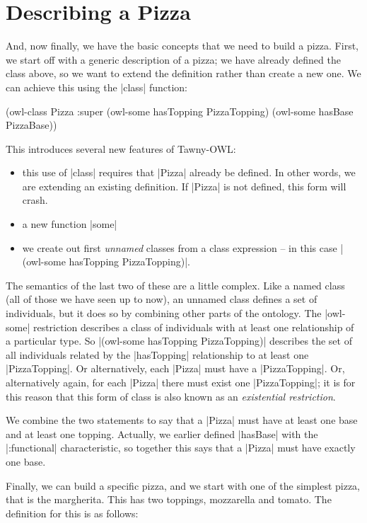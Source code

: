 \section{Describing a Pizza}
\label{sec:describing-pizza}

And, now finally, we have the basic concepts that we need to build a pizza.
First, we start off with a generic description of a pizza; we have already
defined the class above, so we want to extend the definition rather than
create a new one. We can achieve this using the |class| function:

\begin{tawny}
(owl-class Pizza
           :super
           (owl-some hasTopping PizzaTopping)
           (owl-some hasBase PizzaBase))
\end{tawny}

This introduces several new features of Tawny-OWL:
\begin{itemize}
\item this use of |class| requires that |Pizza| already be defined. In other
words, we are extending an existing definition. If |Pizza| is not defined,
this form will crash.
\item a new function |some|
\item we create out first \emph{unnamed} classes from a class expression -- in this
case |(owl-some hasTopping PizzaTopping)|.
\end{itemize}

The semantics of the last two of these are a little complex. Like a named
class (all of those we have seen up to now), an unnamed class defines a set of
individuals, but it does so by combining other parts of the ontology. The
|owl-some| restriction describes a class of individuals with at least one
relationship of a particular type. So
|(owl-some hasTopping PizzaTopping)| describes the set of all individuals
related by the |hasTopping| relationship to at least one
|PizzaTopping|. Or alternatively, each |Pizza| must have a
|PizzaTopping|. Or, alternatively again, for each |Pizza| there must
exist one |PizzaTopping|; it is for this reason that this form of class
is also known as an \emph{existential restriction}.

We combine the two statements to say that a |Pizza| must have at least one
base and at least one topping. Actually, we earlier defined |hasBase| with the
|:functional| characteristic, so together this says that a |Pizza| must have
exactly one base.

Finally, we can build a specific pizza, and we start with one of the simplest
pizza, that is the margherita. This has two toppings, mozzarella and tomato.
The definition for this is as follows:

